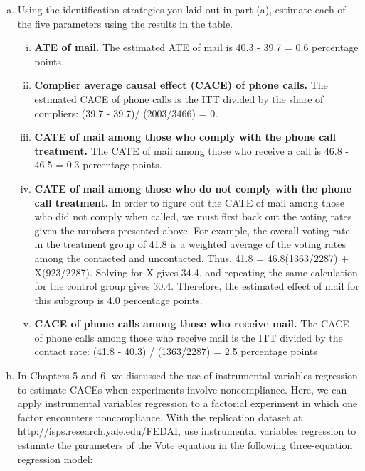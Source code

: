 \documentclass[11pt,notitlepage]{article}\usepackage[]{graphicx}\usepackage[]{color}
\begin{document}
\begin{enumerate}[a)]
\begin{enumerate}[(i)]
\end{enumerate}

\item Using the identification strategies you laid out in part (a), estimate each of the five parameters using the results in the table.

\begin{enumerate}[(i)]

\item \textbf{ATE of mail.} The estimated ATE of mail is 40.3 - 39.7 = 0.6 percentage points.

\item \textbf{Complier average causal effect (CACE) of phone calls.} The estimated CACE of phone calls is the ITT divided by the share of compliers: (39.7 - 39.7)/ (2003/3466) = 0. 

\item \textbf{CATE of mail among those who comply with the phone call treatment.}  The CATE of mail among those who receive a call is 46.8 - 46.5 = 0.3 percentage points. 

\item \textbf{CATE of mail among those who do not comply with the phone call treatment.}  In order to figure out the CATE of mail among those who did not comply when called, we must first back out the voting rates given the numbers presented above. For example, the overall voting rate in the treatment group of 41.8 is a weighted average of the voting rates among the contacted and uncontacted. Thus, 41.8 = 46.8(1363/2287) + X(923/2287). Solving for X gives 34.4, and repeating the same calculation for the control group gives 30.4. Therefore, the estimated effect of mail for this subgroup is 4.0 percentage points. 

\item \textbf{CACE of phone calls among those who receive mail.} The CACE of phone calls among those who receive mail is the ITT divided by the contact rate: (41.8 - 40.3) / (1363/2287) = 2.5 percentage points

\end{enumerate}


\item In Chapters 5 and 6, we discussed the use of instrumental variables regression to estimate CACEs when experiments involve noncompliance. Here, we can apply instrumental variables regression to a factorial experiment in which one factor encounters noncompliance. With the replication dataset at http://isps.research.yale.edu/FEDAI, use instrumental variables regression to estimate the parameters of the Vote equation in the following three-equation regression model:\\


\end{enumerate}
\end{document}
